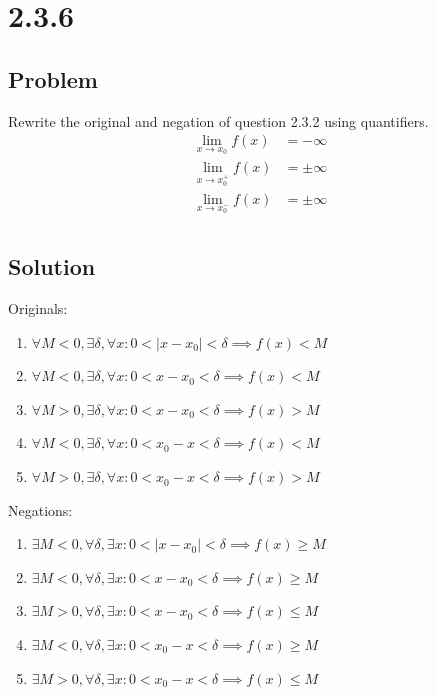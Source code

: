 \documentclass[12pt]{article}
\newcommand{\abs}  [1]{\left|       #1 \right|      }
\begin{document}
\section*{2.3.6}

\subsection*{Problem}
Rewrite the original and negation of question 2.3.2 using quantifiers.
\begin{align*}
    \lim_{x \to x_0} f(x) &= -\infty \\
    \lim_{x \to x_0^+} f(x) &= \pm\infty \\
    \lim_{x \to x_0^-} f(x) &= \pm\infty \\
\end{align*}

\subsection*{Solution}
Originals:
\begin{enumerate}
    \item $\forall M < 0, \exists \delta, \forall x : 0 < \abs{x - x_0} < \delta \implies f(x) < M$
    \item $\forall M < 0, \exists \delta, \forall x : 0 < x - x_0 < \delta \implies f(x) < M$
    \item $\forall M > 0, \exists \delta, \forall x : 0 < x - x_0 < \delta \implies f(x) > M$
    \item $\forall M < 0, \exists \delta, \forall x : 0 < x_0 - x < \delta \implies f(x) < M$
    \item $\forall M > 0, \exists \delta, \forall x : 0 < x_0 - x < \delta \implies f(x) > M$
\end{enumerate}

Negations:
\begin{enumerate}
    \item $\exists M < 0, \forall \delta, \exists x : 0 < \abs{x - x_0} < \delta \implies f(x) \geq M$
    \item $\exists M < 0, \forall \delta, \exists x : 0 < x - x_0 < \delta \implies f(x) \geq M$
    \item $\exists M > 0, \forall \delta, \exists x : 0 < x - x_0 < \delta \implies f(x) \leq M$
    \item $\exists M < 0, \forall \delta, \exists x : 0 < x_0 - x < \delta \implies f(x) \geq M$
    \item $\exists M > 0, \forall \delta, \exists x : 0 < x_0 - x < \delta \implies f(x) \leq M$
\end{enumerate}
\end{document}

